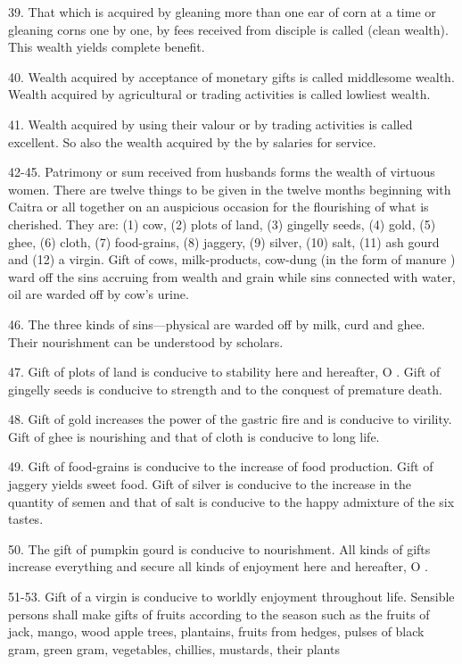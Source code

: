 39. That which is acquired by gleaning more than one ear of corn at a time or
gleaning corns one by one, by fees received from disciple is called
 (clean wealth). This wealth yields complete benefit.

40. Wealth acquired by acceptance of monetary gifts is called middlesome wealth.
Wealth acquired by agricultural or trading activities is called lowliest wealth.

41. Wealth acquired by  using their valour or  by
trading activities is called excellent. So also the wealth acquired by
the  by salaries for service.

42-45. Patrimony or sum received from husbands forms the wealth of virtuous
women. There are twelve things to be given in the twelve months beginning with
Caitra or all together on an auspicious occasion for the flourishing of what is
cherished. They are: (1) cow, (2) plots of land, (3) gingelly seeds, (4) gold,
(5) ghee, (6) cloth, (7) food-grains, (8) jaggery, (9) silver, (10) salt, (11)
ash gourd and (12) a virgin. Gift of cows, milk-products, cow-dung (in the form
of manure \etc) ward off the sins accruing from wealth and grain while sins
connected with water, oil \etc are warded off by cow’s urine.

46. The three kinds of sins—physical \etc are warded off by milk, curd and ghee.
Their nourishment can be understood by scholars.

47. Gift of plots of land is conducive to stability here and hereafter, O
. Gift of gingelly seeds is conducive to strength and to
the conquest of premature death.

48. Gift of gold increases the power of the gastric fire and is conducive to
virility. Gift of ghee is nourishing and that of cloth is conducive to long life.

49. Gift of food-grains is conducive to the increase of food production. Gift of
jaggery yields sweet food. Gift of silver is conducive to the increase in
the quantity of semen and that of salt is conducive to the happy admixture of
the six tastes.

50. The gift of pumpkin gourd is conducive to nourishment. All kinds of gifts
increase everything and secure all kinds of enjoyment here and hereafter,
O .

51-53. Gift of a virgin is conducive to worldly enjoyment throughout life.
Sensible persons shall make gifts of fruits according to the season such as
the fruits of jack, mango, wood apple trees, plantains, fruits from hedges,
pulses of black gram, green gram, vegetables, chillies, mustards, their plants
\etc

